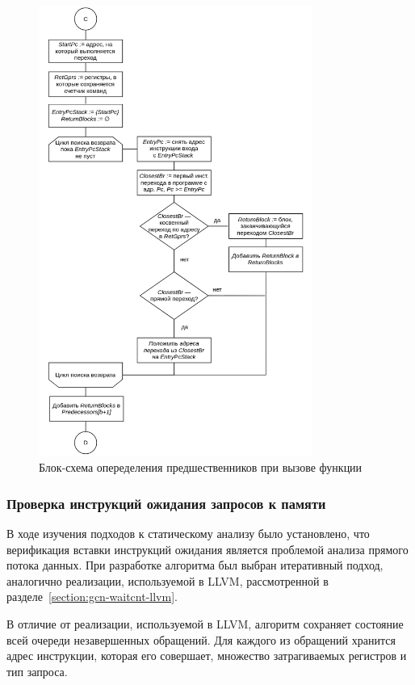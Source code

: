 \documentclass[a4paper,14pt]{extarticle}
\begin{document}
{\begin{figure}[H]
\centering
\includegraphics[width=0.8\textwidth]{diagrams/alg-cfg-call}
\caption{Блок-схема опеределения предшественников при вызове функции}
\label{fig:diagram-cfg-call}
\end{figure}

\subsubsection{Проверка инструкций ожидания запросов к памяти}

В ходе изучения подходов к статическому анализу было установлено, что верификация
вставки инструкций ожидания является проблемой анализа прямого потока данных.
При разработке алгоритма был выбран итеративный подход, аналогично реализации,
используемой в LLVM, рассмотренной в разделе~\ref{section:gcn-waitcnt-llvm}.

В отличие от реализации, используемой в LLVM, алгоритм сохраняет состояние всей очереди
незавершенных обращений. Для каждого из обращений хранится адрес инструкции, которая его
совершает, множество затрагиваемых регистров и тип запроса.

}
\end{document}
